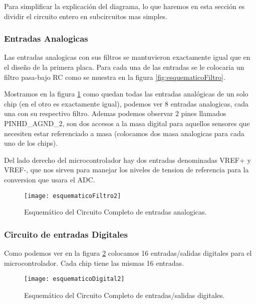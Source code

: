 Para simplificar la explicación del diagrama, lo que haremos en esta sección es dividir el circuito entero en subcircuitos mas simples.

\subsubsection{Entradas Analogicas}
\label{subsub: entradas_analogicas2}

Las entradas analogicas con sus filtros se mantuvieron exactamente igual que en el diseño de la primera placa. Para cada una de las entradas se le colocaria un filtro pasa-bajo RC como se muestra en la figura \ref{fig:esquematicoFiltro}.

Mostramos en la figura \ref{fig:esquematicoFiltro2} como quedan todas las entradas analógicas de un solo chip (en el otro es exactamente igual), podemos ver 8 entradas analogicas, cada una con su respectivo filtro. Ademas podemos observar 2 pines llamados PINHD\_AGND\_2, son dos accesos a la masa digital para aquellos sensores que necesiten estar referenciado a masa (colocamos dos masa analogicas para cada uno de los chips).

Del lado derecho del microcontrolador hay dos entradas denominadas VREF+ y VREF-, que nos sirven para manejar los niveles de tension de referencia para la conversion que usara el ADC.

\begin{figure}
\centering
  \texttt{[image: esquematicoFiltro2]}
  \caption{Esquemático del Circuito Completo de entradas analogicas.}\label{fig:esquematicoFiltro2}
\end{figure}


\subsubsection{Circuito de entradas Digitales}
\label{subsub:entradas_digitales}

Como podemos ver en la figura \ref{fig:esquematicoDigital2} colocamos 16 entradas/salidas digitales para el microcontrolador. Cada chip tiene las mismas 16 entradas.

\begin{figure}	
\centering
  \texttt{[image: esquematicoDigital2]}
  \caption{Esquemático del Circuito Completo de entradas/salidas digitales.}\label{fig:esquematicoDigital2}
\end{figure}


